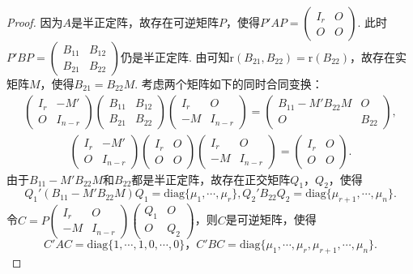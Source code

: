 \documentclass[../../main.tex]{subfiles}%
\begin{document}
\begin{proof}
因为\(A\)是半正定阵，故存在可逆矩阵\(P\)，使得\(P'AP=\begin{pmatrix}I_r&O\\O&O\end{pmatrix}\). 此时\(P'BP=\begin{pmatrix}B_{11}&B_{12}\\B_{21}&B_{22}\end{pmatrix}\)仍是半正定阵. 由可知\(\mathrm{r}(B_{21},B_{22})=\mathrm{r}(B_{22})\)，故存在实矩阵\(M\)，使得\(B_{21}=B_{22}M\). 考虑两个矩阵如下的同时合同变换：
\begin{align*}
\begin{pmatrix}I_r&-M'\\O&I_{n - r}\end{pmatrix}\begin{pmatrix}B_{11}&B_{12}\\B_{21}&B_{22}\end{pmatrix}\begin{pmatrix}I_r&O\\-M&I_{n - r}\end{pmatrix}=\begin{pmatrix}B_{11}-M'B_{22}M&O\\O&B_{22}\end{pmatrix},
\end{align*}
\begin{align*}
\begin{pmatrix}I_r&-M'\\O&I_{n - r}\end{pmatrix}\begin{pmatrix}I_r&O\\O&O\end{pmatrix}\begin{pmatrix}I_r&O\\-M&I_{n - r}\end{pmatrix}=\begin{pmatrix}I_r&O\\O&O\end{pmatrix}.
\end{align*}
由于\(B_{11}-M'B_{22}M\)和\(B_{22}\)都是半正定阵，故存在正交矩阵\(Q_1\)，\(Q_2\)，使得
\[
Q_1'(B_{11}-M'B_{22}M)Q_1 = \mathrm{diag}\{\mu_1,\cdots,\mu_r\},
Q_2'B_{22}Q_2 = \mathrm{diag}\{\mu_{r + 1},\cdots,\mu_n\}.
\]
令\(C = P\begin{pmatrix}I_r&O\\-M&I_{n - r}\end{pmatrix}\begin{pmatrix}Q_1&O\\O&Q_2\end{pmatrix}\)，则\(C\)是可逆矩阵，使得
\[
C'AC = \mathrm{diag}\{1,\cdots,1,0,\cdots,0\}，
C'BC = \mathrm{diag}\{\mu_1,\cdots,\mu_r,\mu_{r + 1},\cdots,\mu_n\}. 
\]
\end{proof}
\end{document}
